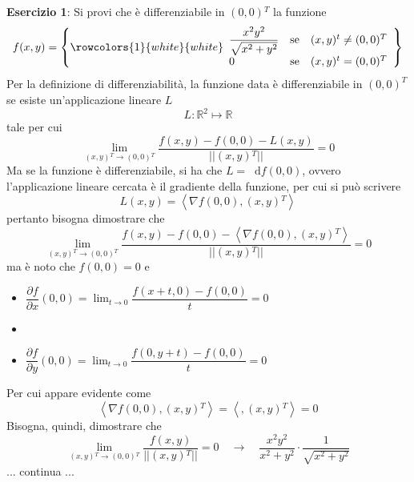 \documentclass[a4paper]{extarticle}
\newcommand*\dif{\mathop{}\!\mathrm{d}}
\begin{document}
\vspace{2em}
\noindent
\textbf{Esercizio 1}: Si provi che è differenziabile in $(0,0){^T}$ la funzione
\[
    f(x,y)=\left\{
        \rowcolors{1}{white}{white}    
        \begin{array}{lll}
            \dfrac{x^2y^2}{\sqrt{x^2+y^2}} & \text{se} & (x,y){^t} \neq (0,0){^T}\\
            0   & \text{se} & (x,y){^t} = (0,0){^T}\\
        \end{array}
    \right\}
\]
Per la definizione di differenziabilità, la funzione data è differenziabile in $(0,0)^T$ se esiste un'applicazione lineare $L$
\[L : \mathbb{R}^2 \longmapsto \mathbb{R}\]
tale per cui
\[\lim_{(x,y){^T} \to (0,0){^T}} \dfrac{f(x,y) - f(0,0) - L(x,y)}{\vert \vert (x,y){^T} \vert \vert} = 0\]
Ma se la funzione è differenziabile, si ha che $L=\dif f(0,0)$, ovvero l'applicazione lineare cercata è il gradiente della funzione, per cui si può scrivere
\[L(x,y) = \left<\nabla f(0,0), (x,y){^T} \right>\]
pertanto bisogna dimostrare che
\[\lim_{(x,y){^T} \to (0,0){^T}} \dfrac{f(x,y) - f(0,0) - \left<\nabla f(0,0), (x,y){^T} \right>}{\vert \vert (x,y){^T} \vert \vert} = 0\]
ma è noto che $f(0,0)=0$ e
\begin{itemize}
    \item $\dfrac{\partial f}{\partial x} (0,0) = \lim_{t \to 0} \dfrac{f(x+t,0) - f(0,0)}{t} = 0$
    \item \item $\dfrac{\partial f}{\partial y} (0,0) = \lim_{t \to 0} \dfrac{f(0,y+t) - f(0,0)}{t} = 0$
\end{itemize}
Per cui appare evidente come
\[\left<\nabla f(0,0), (x,y){^T} \right> = \left<, (x,y){^T} \right> = 0\]
Bisogna, quindi, dimostrare che
\[\lim_{(x,y){^T} \to (0,0){^T}} \dfrac{f(x,y)}{\vert \vert (x,y){^T} \vert \vert} = 0 \hspace{1em} \rightarrow \hspace{1em} \dfrac{x^2y^2}{x^2+y^2} \cdot \dfrac{1}{\sqrt{x^2+y^2}}\]
... continua ...
\end{document}
